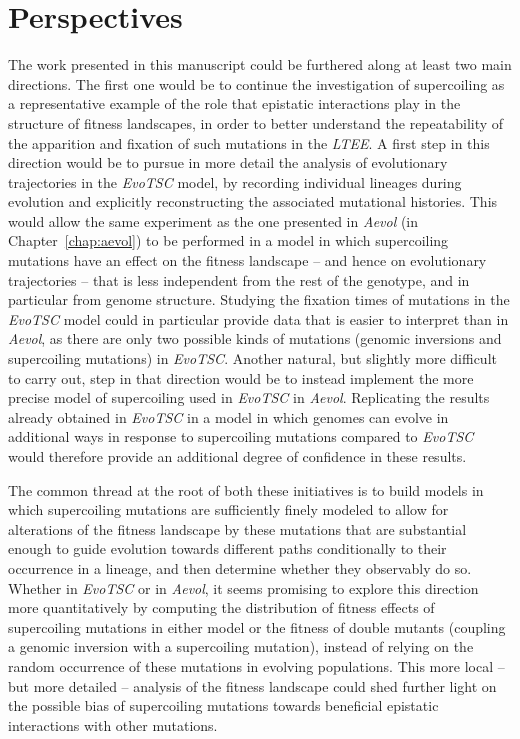 \section{Perspectives}

The work presented in this manuscript could be furthered along at least two main directions.
The first one would be to continue the investigation of supercoiling as a representative example of the role that epistatic interactions play in the structure of fitness landscapes, in order to better understand the repeatability of the apparition and fixation of such mutations in the \emph{LTEE}.
A first step in this direction would be to pursue in more detail the analysis of evolutionary trajectories in the \emph{EvoTSC} model, by recording individual lineages during evolution and explicitly reconstructing the associated mutational histories.
This would allow the same experiment as the one presented in \emph{Aevol} (in Chapter~\ref{chap:aevol}) to be performed in a model in which supercoiling mutations have an effect on the fitness landscape -- and hence on evolutionary trajectories -- that is less independent from the rest of the genotype, and in particular from genome structure.
Studying the fixation times of mutations in the \emph{EvoTSC} model could in particular provide data that is easier to interpret than in \emph{Aevol}, as there are only two possible kinds of mutations (genomic inversions and supercoiling mutations) in \emph{EvoTSC}.
Another natural, but slightly more difficult to carry out, step in that direction would be to instead implement the more precise model of supercoiling used in \emph{EvoTSC} in \emph{Aevol}.
Replicating the results already obtained in \emph{EvoTSC} in a model in which genomes can evolve in additional ways in response to supercoiling mutations compared to \emph{EvoTSC} would therefore provide an additional degree of confidence in these results.

The common thread at the root of both these initiatives is to build models in which supercoiling mutations are sufficiently finely modeled to allow for alterations of the fitness landscape by these mutations that are substantial enough to guide evolution towards different paths conditionally to their occurrence in a lineage, and then determine whether they observably do so.
Whether in \emph{EvoTSC} or in \emph{Aevol}, it seems promising to explore this direction more quantitatively by computing the distribution of fitness effects of supercoiling mutations in either model or the fitness of double mutants (coupling a genomic inversion with a supercoiling mutation), instead of relying on the random occurrence of these mutations in evolving populations.
This more local -- but more detailed -- analysis of the fitness landscape could shed further light on the possible bias of supercoiling mutations towards beneficial epistatic interactions with other mutations.

